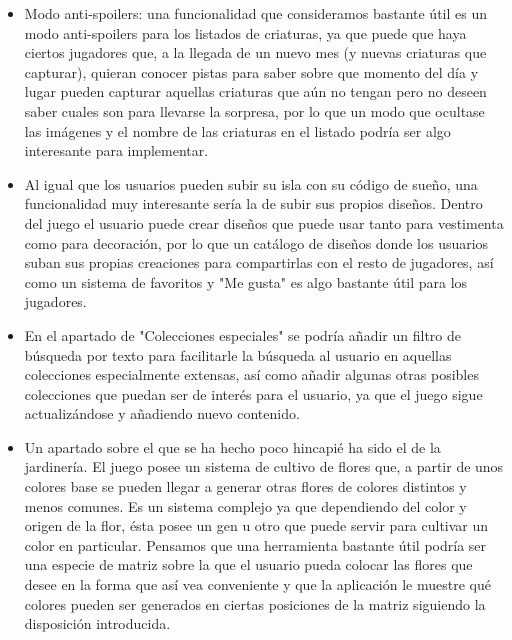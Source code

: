 \begin{itemize}
	
	\item Modo anti-spoilers: una funcionalidad que consideramos bastante útil es un modo anti-spoilers para los listados de criaturas, ya que puede que haya ciertos jugadores que, a la llegada de un nuevo mes (y nuevas criaturas que capturar), quieran conocer pistas para saber sobre que momento del día y lugar pueden capturar aquellas criaturas que aún no tengan pero no deseen saber cuales son para llevarse la sorpresa, por lo que un modo que ocultase las imágenes y el nombre de las criaturas en el listado podría ser algo interesante para implementar.
	
	\item Al igual que los usuarios pueden subir su isla con su código de sueño, una funcionalidad muy interesante sería la de subir sus propios diseños. Dentro del juego el usuario puede crear diseños que puede usar tanto para vestimenta como para decoración, por lo que un catálogo de diseños donde los usuarios suban sus propias creaciones para compartirlas con el resto de jugadores, así como un sistema de favoritos y "Me gusta" es algo bastante útil para los jugadores.
	
	\item En el apartado de "Colecciones especiales" se podría añadir un filtro de búsqueda por texto para facilitarle la búsqueda al usuario en aquellas colecciones especialmente extensas, así como añadir algunas otras posibles colecciones que puedan ser de interés para el usuario, ya que el juego sigue actualizándose y añadiendo nuevo contenido.
	
	\item Un apartado sobre el que se ha hecho poco hincapié ha sido el de la jardinería. El juego posee un sistema de cultivo de flores que, a partir de unos colores base se pueden llegar a generar otras flores de colores distintos y menos comunes. Es un sistema complejo ya que dependiendo del color y origen de la flor, ésta posee un gen u otro que puede servir para cultivar un color en particular. Pensamos que una herramienta bastante útil podría ser una especie de matriz sobre la que el usuario pueda colocar las flores que desee en la forma que así vea conveniente y que la aplicación le muestre qué colores pueden ser generados en ciertas posiciones de la matriz siguiendo la disposición introducida.
	
\end{itemize}



	


